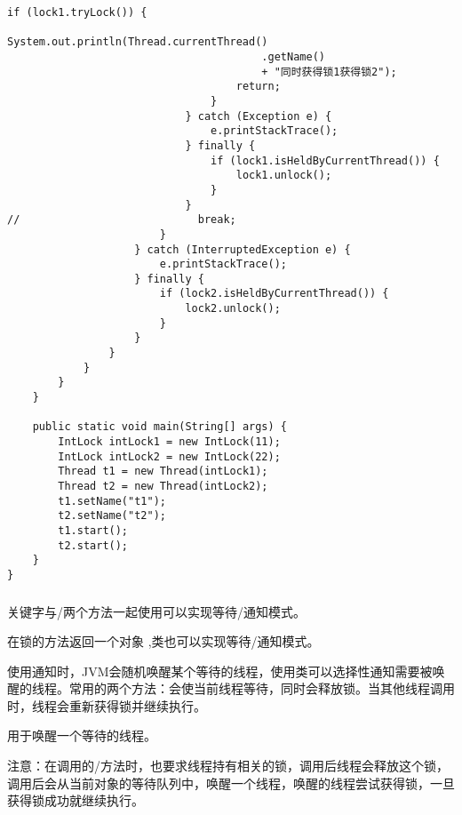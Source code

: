 \documentclass[a4paper]{report}
\begin{document}
\begin{Verbatim}[frame=single,numbersep=5pt,xleftmargin=1.5em,xrightmargin=1.5em]
                                if (lock1.tryLock()) {
                                    System.out.println(Thread.currentThread()
                                        .getName()
                                        + "同时获得锁1获得锁2");
                                    return;
                                }
                            } catch (Exception e) {
                                e.printStackTrace();
                            } finally {
                                if (lock1.isHeldByCurrentThread()) {
                                    lock1.unlock();
                                }
                            }
//                            break;
                        }
                    } catch (InterruptedException e) {
                        e.printStackTrace();
                    } finally {
                        if (lock2.isHeldByCurrentThread()) {
                            lock2.unlock();
                        }
                    }
                }
            }
        }
    }

    public static void main(String[] args) {
        IntLock intLock1 = new IntLock(11);
        IntLock intLock2 = new IntLock(22);
        Thread t1 = new Thread(intLock1);
        Thread t2 = new Thread(intLock2);
        t1.setName("t1");
        t2.setName("t2");
        t1.start();
        t2.start();
    }
}
\end{Verbatim}

\subsubsection{}

关键字与/两个方法一起使用可以实现等待/通知模式。

在锁的方法返回一个对象 ,类也可以实现等待/通知模式。

使用通知时，JVM会随机唤醒某个等待的线程，使用类可以选择性通知需要被唤醒的线程。常用的两个方法：会使当前线程等待，同时会释放锁。当其他线程调用时，线程会重新获得锁并继续执行。

用于唤醒一个等待的线程。

注意：在调用的/方法时，也要求线程持有相关的锁，调用后线程会释放这个锁，调用后会从当前对象的等待队列中，唤醒一个线程，唤醒的线程尝试获得锁，一旦获得锁成功就继续执行。
\end{document}
